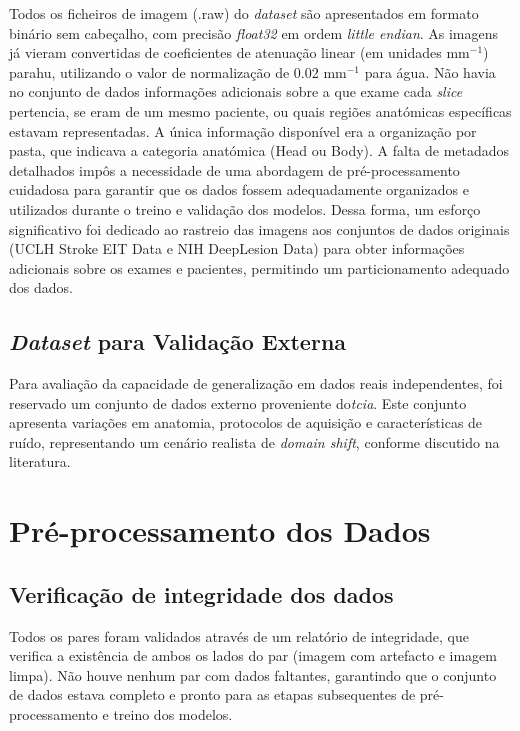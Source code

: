 Todos os ficheiros de imagem (.raw) do \textit{dataset} são apresentados em formato binário sem cabeçalho, com precisão \textit{float32} em ordem \textit{little endian}. As imagens já vieram convertidas de coeficientes de atenuação linear (em unidades mm$^{-1}$) para\Acrfull{hu}, utilizando o valor de normalização de 0.02 mm$^{-1}$ para água.
Não havia no conjunto de dados informações adicionais sobre a que exame cada \textit{slice} pertencia, se eram de um mesmo paciente, ou quais regiões anatómicas específicas estavam representadas. A única informação disponível era a organização por pasta, que indicava a categoria anatómica (Head ou Body). A falta de metadados detalhados impôs a necessidade de uma abordagem de pré-processamento cuidadosa para garantir que os dados fossem adequadamente organizados e utilizados durante o treino e validação dos modelos. Dessa forma, um esforço significativo foi dedicado ao rastreio das imagens aos conjuntos de dados originais (UCLH Stroke EIT Data e NIH DeepLesion Data) para obter informações adicionais sobre os exames e pacientes, permitindo um particionamento adequado dos dados.

\subsection{\textit{Dataset} para Validação Externa}
Para avaliação da capacidade de generalização em dados reais independentes, foi reservado um conjunto de dados externo proveniente do\textit{\Acrfull{tcia}}. Este conjunto apresenta variações em anatomia, protocolos de aquisição e características de ruído, representando um cenário realista de \textit{domain shift}, conforme discutido na literatura.

\section{Pré-processamento dos Dados}
\subsection{Verificação de integridade dos dados}
Todos os pares foram validados através de um relatório de integridade, que verifica a existência de ambos os lados do par (imagem com artefacto e imagem limpa). Não houve nenhum par com dados faltantes, garantindo que o conjunto de dados estava completo e pronto para as etapas subsequentes de pré-processamento e treino dos modelos.

